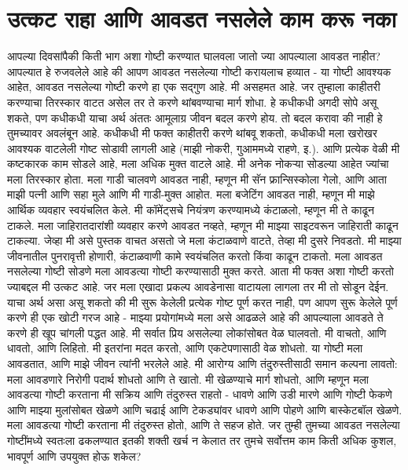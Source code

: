 \chapter{उत्कट राहा आणि आवडत नसलेले काम करू नका}
आपल्या दिवसांपैकी किती भाग अशा गोष्टी करण्यात घालवला जातो ज्या आपल्याला आवडत नाहीत? आपल्यात हे रुजवलेले आहे की आपण आवडत नसलेल्या गोष्टी करायलाच हव्यात - या गोष्टी आवश्यक आहेत, आवडत नसलेल्या गोष्टी करणे हा एक सद्गुण आहे. मी असहमत आहे.
जर तुम्हाला काहीतरी करण्याचा तिरस्कार वाटत असेल तर ते करणे थांबवण्याचा मार्ग शोधा. हे कधीकधी अगदी सोपे असू शकते, पण कधीकधी याचा अर्थ अंततः आमूलाग्र जीवन बदल करणे होय. तो बदल करावा की नाही हे तुमच्यावर अवलंबून आहे.
कधीकधी मी फक्त काहीतरी करणे थांबवू शकतो, कधीकधी मला खरोखर आवश्यक वाटलेली गोष्ट सोडावी लागली आहे (माझी नोकरी, गुआममध्ये राहणे, इ.). आणि प्रत्येक वेळी मी कष्टकारक काम सोडले आहे, मला अधिक मुक्त वाटले आहे.
मी अनेक नोकऱ्या सोडल्या आहेत ज्यांचा मला तिरस्कार होता. मला गाडी चालवणे आवडत नाही, म्हणून मी सॅन फ्रान्सिस्कोला गेलो, आणि आता माझी पत्नी आणि सहा मुले आणि मी गाडी-मुक्त आहोत. मला बजेटिंग आवडत नाही, म्हणून मी माझे आर्थिक व्यवहार स्वयंचलित केले. मी कॉमेंट्सचे नियंत्रण करण्यामध्ये कंटाळलो, म्हणून मी ते काढून टाकले. मला जाहिरातदारांशी व्यवहार करणे आवडत नव्हते, म्हणून मी माझ्या साइटवरून जाहिराती काढून टाकल्या. जेव्हा मी असे पुस्तक वाचत असतो जे मला कंटाळवाणे वाटते, तेव्हा मी दुसरे निवडतो. मी माझ्या जीवनातील पुनरावृत्ती होणारी, कंटाळवाणी कामे स्वयंचलित करतो किंवा काढून टाकतो.
मला आवडत नसलेल्या गोष्टी सोडणे मला आवडत्या गोष्टी करण्यासाठी मुक्त करते. आता मी फक्त अशा गोष्टी करतो ज्याबद्दल मी उत्कट आहे. जर मला एखादा प्रकल्प आवडेनासा वाटायला लागला तर मी तो सोडून देईन. याचा अर्थ असा असू शकतो की मी सुरू केलेली प्रत्येक गोष्ट पूर्ण करत नाही, पण आपण सुरू केलेले पूर्ण करणे ही एक खोटी गरज आहे - माझ्या प्रयोगांमध्ये मला असे आढळले आहे की आपल्याला आवडते ते करणे ही खूप चांगली पद्धत आहे.
मी सर्वात प्रिय असलेल्या लोकांसोबत वेळ घालवतो. मी वाचतो, आणि धावतो, आणि लिहितो. मी इतरांना मदत करतो, आणि एकटेपणासाठी वेळ शोधतो. या गोष्टी मला आवडतात, आणि माझे जीवन त्यांनी भरलेले आहे.
मी आरोग्य आणि तंदुरुस्तीसाठी समान कल्पना लावतो: मला आवडणारे निरोगी पदार्थ शोधतो आणि ते खातो. मी खेळण्याचे मार्ग शोधतो, आणि म्हणून मला आवडत्या गोष्टी करताना मी सक्रिय आणि तंदुरुस्त राहतो - धावणे आणि उडी मारणे आणि गोष्टी फेकणे आणि माझ्या मुलांसोबत खेळणे आणि चढाई आणि टेकड्यांवर धावणे आणि पोहणे आणि बास्केटबॉल खेळणे. मला आवडत्या गोष्टी करताना मी तंदुरुस्त होतो, आणि ते सहज होते.
जर तुम्ही तुमच्या आवडत नसलेल्या गोष्टींमध्ये स्वतःला ढकलण्यात इतकी शक्ती खर्च न केलात तर तुमचे सर्वोत्तम काम किती अधिक कुशल, भावपूर्ण आणि उपयुक्त होऊ शकेल?

